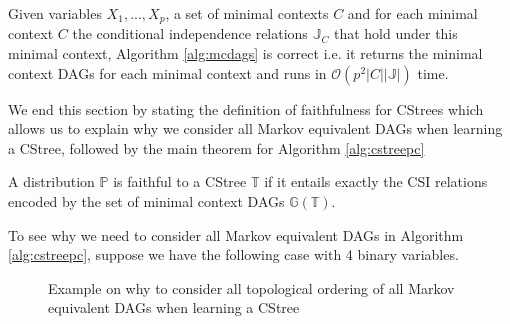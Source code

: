 \documentclass{tufte-book}
\begin{document}
\begin{theorem}\label{thm:mcdagscorrectness}
Given variables $X_1,...,X_p$, a set of minimal contexts $C$ and for each minimal context $C$ the conditional independence relations $\mathbb{J}_C$ that hold under this minimal context, Algorithm \ref{alg:mcdags} is correct i.e. it returns the minimal context DAGs for each minimal context and runs in $\mathcal{O}(p^2 |C||\mathbb{J}|)$ time.
\end{theorem}





We end this section by stating the definition of faithfulness for CStrees which allows us to explain why we consider all Markov equivalent DAGs when learning a CStree, followed by the main theorem for Algorithm \ref{alg:cstreepc}

\begin{definition}\label{def:faithfulnesscstrees}
A distribution $\mathbb{P}$ is faithful to a CStree $\mathbb{T}$ if it entails exactly the CSI relations encoded by the set of minimal context DAGs $\mathbb{G}(\mathbb{T})$.
\end{definition}

To see why we need to consider all Markov equivalent DAGs in Algorithm \ref{alg:cstreepc}, suppose we have the following case with 4 binary variables.


\begin{figure}[!h]\label{fig:dagtocstree_cstree}
   \begin{floatrow}
%
\caption{Example on why to consider all topological ordering of all Markov equivalent DAGs when learning a CStree}
        
   \end{floatrow}
\end{figure}
\end{document}
